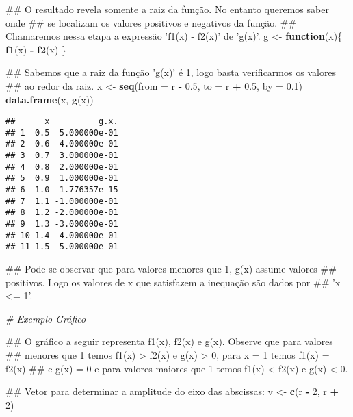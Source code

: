 \documentclass[]{book}
\newenvironment{Shaded}{\begin{snugshade}}{\end{snugshade}}
\newcommand{\KeywordTok}[1]{\textcolor[rgb]{0.13,0.29,0.53}{\textbf{#1}}}
\newcommand{\DataTypeTok}[1]{\textcolor[rgb]{0.13,0.29,0.53}{#1}}
\newcommand{\DecValTok}[1]{\textcolor[rgb]{0.00,0.00,0.81}{#1}}
\newcommand{\FloatTok}[1]{\textcolor[rgb]{0.00,0.00,0.81}{#1}}
\newcommand{\StringTok}[1]{\textcolor[rgb]{0.31,0.60,0.02}{#1}}
\newcommand{\CommentTok}[1]{\textcolor[rgb]{0.56,0.35,0.01}{\textit{#1}}}
\newcommand{\ControlFlowTok}[1]{\textcolor[rgb]{0.13,0.29,0.53}{\textbf{#1}}}
\newcommand{\OperatorTok}[1]{\textcolor[rgb]{0.81,0.36,0.00}{\textbf{#1}}}
\newcommand{\NormalTok}[1]{#1}
\begin{document}
\begin{enumerate}
\begin{Shaded}
\begin{Highlighting}[]
\NormalTok{##  O resultado revela somente a raiz da função. No entanto queremos saber onde}
\NormalTok{## se localizam os valores positivos e negativos da função.}
\NormalTok{##  Chamaremos nessa etapa a expressão 'f1(x) - f2(x)' de 'g(x)'.}
\NormalTok{g <-}\StringTok{ }\ControlFlowTok{function}\NormalTok{(x)\{}
  \KeywordTok{f1}\NormalTok{(x) }\OperatorTok{-}\StringTok{ }\KeywordTok{f2}\NormalTok{(x)}
\NormalTok{\}}

\NormalTok{##  Sabemos que a raiz da função 'g(x)' é 1, logo basta verificarmos os valores}
\NormalTok{## ao redor da raiz.}
\NormalTok{x <-}\StringTok{ }\KeywordTok{seq}\NormalTok{(}\DataTypeTok{from =}\NormalTok{ r }\OperatorTok{-}\StringTok{ }\FloatTok{0.5}\NormalTok{, }\DataTypeTok{to =}\NormalTok{ r }\OperatorTok{+}\StringTok{ }\FloatTok{0.5}\NormalTok{, }\DataTypeTok{by =} \FloatTok{0.1}\NormalTok{)}
\KeywordTok{data.frame}\NormalTok{(x, }\KeywordTok{g}\NormalTok{(x))}
\end{Highlighting}
\end{Shaded}

\begin{verbatim}
##      x          g.x.
## 1  0.5  5.000000e-01
## 2  0.6  4.000000e-01
## 3  0.7  3.000000e-01
## 4  0.8  2.000000e-01
## 5  0.9  1.000000e-01
## 6  1.0 -1.776357e-15
## 7  1.1 -1.000000e-01
## 8  1.2 -2.000000e-01
## 9  1.3 -3.000000e-01
## 10 1.4 -4.000000e-01
## 11 1.5 -5.000000e-01
\end{verbatim}

\begin{Shaded}
\begin{Highlighting}[]
\NormalTok{##  Pode-se observar que para valores menores que 1, g(x) assume valores}
\NormalTok{## positivos. Logo os valores de x que satisfazem a inequação são dados por}
\NormalTok{## 'x <= 1'.}

\CommentTok{# Exemplo Gráfico}

\NormalTok{##  O gráfico a seguir representa f1(x), f2(x) e g(x). Observe que para valores}
\NormalTok{## menores que 1 temos f1(x) > f2(x) e g(x) > 0, para x = 1 temos f1(x) = f2(x)}
\NormalTok{## e g(x) = 0 e para valores maiores que 1 temos f1(x) < f2(x) e g(x) < 0.}

\NormalTok{##  Vetor para determinar a amplitude do eixo das abscissas:}
\NormalTok{v <-}\StringTok{ }\KeywordTok{c}\NormalTok{(r }\OperatorTok{-}\StringTok{ }\DecValTok{2}\NormalTok{, r }\OperatorTok{+}\StringTok{ }\DecValTok{2}\NormalTok{)}


\end{Highlighting}
\end{Shaded}
\end{enumerate}
\end{document}
